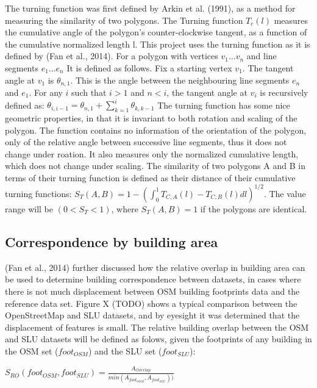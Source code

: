 \documentclass[a4paper]{article}
\begin{document}
The turning function was first defined by Arkin et al. (1991), as a method for measuring the similarity of two polygons. The Turning function $T_c(l)$ measures the cumulative angle of the polygon's counter-clockwise tangent, as a function of the cumulative normalized length l. This project uses the turning function as it is defined by (Fan et al., 2014). For a polygon with vertices ${v_1 ... v_n}$ and line segments ${e_1 ... e_n}$ It is defined as follows.
Fix a starting vertex $v_1$.
The tangent angle at $v_1$ is $\theta_{n,1}$. This is the angle between the neighbouring line segments $e_n$ and $e_1$.
For any $i$ such that $i>1$ and $n<i$, the tangent angle at $v_i$ is recursively defined as: $\theta_{i, i-1} = \theta_{n,1} + \sum^{i}_{k=1} \theta_{k, k-1}$
The turning function has some nice geometric properties, in that it is invariant to both rotation and scaling of the polygon. The function contains no information of the orientation of the polygon, only of the relative angle between successive line segments, thus it does not change under roation. It also measures only the normalized cumulative length, which does not change under scaling.
The similarity of two polygons A and B in terms of their turning function is defined as their distance of their cumulative turning functions: $S_{T}(A, B) = 1 - (\int^{1}_{0} T_{C,A}(l) - T_{C,B}(l) dl)^{1/2}$.
The value range will be $(0 < S_{T} < 1)$, where $S_{T}(A,B) = 1$ if the polygons are identical. 


\subsection{Correspondence by building area}

(Fan et al., 2014) further discussed how the relative overlap in building area can be used to determine building correspondence between datasets, in cases where there is not much displacement between OSM building footprints data and the reference data set. Figure X (TODO) shows a typical comparison between the OpenStreetMap and SLU datasets, and by eyesight it was determined that the displacement of features is small. The relative building overlap between the OSM and SLU datasets will be defined as folows, given the footprints of any building in the OSM set ($foot_{OSM}$) and the SLU set ($foot_{SLU}$):

$S_{RO}(foot_{OSM}, foot_{SLU}) = \frac{A_{Overlap}}{min(A_{foot_{OSM}}, A_{foot_{SLU}}))}$
\end{document}
